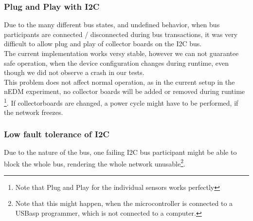 \documentclass[a4paper]{scrreprt}
\begin{document}
\subsubsection{Plug and Play with I2C}
Due to the many different bus states, and undefined behavior, when bus
participants are connected / disconnected during bus transactions, it was
very difficult to allow plug and play of collector boards on the I2C bus.\\
The current implementation works versy stable, however we can not guarantee
safe operation, when the device configuration changes during runtime, even though
we did not observe a crash in our tests.\\
This problem does not affect normal operation, as in the current setup in the
nEDM experiment, no collector boards will be added or removed during runtime
\footnote{Note that Plug and Play for the individual sensors works perfectly}.
If collectorboards are changed, a power cycle might have to be performed, if
the network freezes.
\subsubsection{Low fault tolerance of I2C}
Due to the nature of the bus, one failing I2C bus participant might be able to
block the whole bus, rendering the whole network unusable\footnote{Note that this
might happen, when the microcontroller is connected to a USBasp programmer, which
is not connected to a computer.}.
\end{document}
